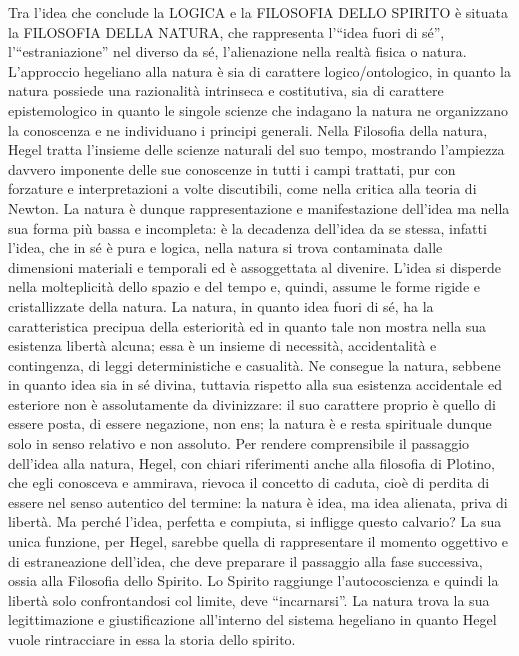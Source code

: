 \documentclass[a4paper,12pt,oneside,openany]{book}%
\begin{document}
Tra l’idea che conclude la LOGICA e la FILOSOFIA DELLO SPIRITO è situata la FILOSOFIA DELLA NATURA, che rappresenta l’“idea fuori di sé”, l’“estraniazione” nel diverso da sé, l’alienazione nella realtà fisica o natura. L’approccio hegeliano alla natura è sia di carattere logico/ontologico, in quanto la natura possiede una razionalità intrinseca e costitutiva, sia di carattere epistemologico in quanto le singole scienze che indagano la natura ne organizzano la conoscenza e ne individuano i principi generali. Nella Filosofia della natura, Hegel tratta l’insieme delle scienze naturali del suo tempo, mostrando l’ampiezza davvero imponente delle sue conoscenze in tutti i campi trattati, pur con forzature e interpretazioni a volte discutibili, come nella critica alla teoria di Newton.
La natura è dunque rappresentazione e manifestazione dell’idea ma nella sua forma più bassa e incompleta: è la decadenza dell’idea da se stessa, infatti l’idea, che in sé è pura e logica, nella natura si trova contaminata dalle dimensioni materiali e temporali ed è assoggettata al divenire. L’idea si disperde nella molteplicità dello spazio e del tempo e, quindi, assume le forme rigide e cristallizzate della natura. La natura, in quanto idea fuori di sé, ha la caratteristica precipua della esteriorità ed in quanto tale non mostra nella sua esistenza libertà alcuna; essa è un insieme di necessità, accidentalità e contingenza, di leggi deterministiche e casualità. Ne consegue la natura, sebbene in quanto idea sia in sé divina, tuttavia rispetto alla sua esistenza accidentale ed esteriore non è assolutamente da divinizzare: il suo carattere proprio è quello di essere posta, di essere negazione, non ens; la natura è e resta spirituale dunque solo in senso relativo e non assoluto. Per rendere comprensibile il passaggio dell’idea alla natura, Hegel, con chiari riferimenti anche alla filosofia di Plotino, che egli conosceva e ammirava, rievoca il concetto di caduta, cioè di perdita di essere nel senso autentico del termine: la natura è idea, ma idea alienata, priva di libertà. Ma perché l’idea, perfetta e compiuta, si infligge questo calvario? La sua unica funzione, per Hegel, sarebbe quella di rappresentare il momento oggettivo e di estraneazione dell’idea, che deve preparare il passaggio alla fase successiva, ossia alla Filosofia dello Spirito. Lo Spirito raggiunge l’autocoscienza e quindi la libertà solo confrontandosi col limite, deve “incarnarsi”. La natura trova la sua legittimazione e giustificazione all’interno del sistema hegeliano in quanto Hegel vuole rintracciare in essa la storia dello spirito.
\end{document}
